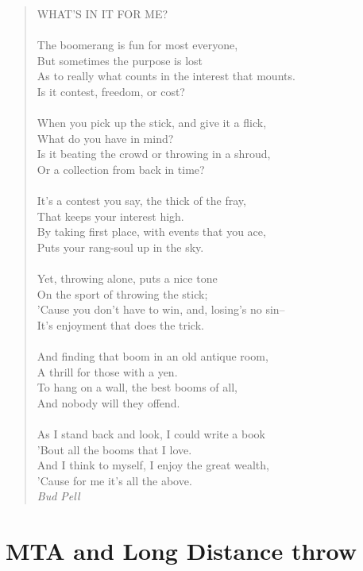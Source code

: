 \begin{quote}
WHAT'S IN IT FOR ME?\\
\\
The boomerang is fun for most everyone,\\
But sometimes the purpose is lost\\
As to really what counts in the interest that mounts.\\
Is it contest, freedom, or cost?\\
\\
When you pick up the stick, and give it a flick,\\
What do you have in mind?\\
Is it beating the crowd or throwing in a shroud,\\
Or a collection from back in time?\\
\\
It’s a contest you say, the thick of the fray,\\
That keeps your interest high.\\
By taking first place, with events that you ace,\\
Puts your rang-soul up in the sky.\\
\\
Yet, throwing alone, puts a nice tone\\
On the sport of throwing the stick;\\
’Cause you don’t have to win, and, losing’s no sin--\\
It’s enjoyment that does the trick.\\
\\
And finding that boom in an old antique room,\\
A thrill for those with a yen.\\
To hang on a wall, the best booms of all,\\
And nobody will they offend.\\
\\
As I stand back and look, I could write a book\\
’Bout all the booms that I love.\\
And I think to myself, I enjoy the great wealth,\\
’Cause for me it’s all the above.\\
\footnotesize \textit{Bud Pell}
\end{quote}

\chapter{MTA and Long Distance throw}

